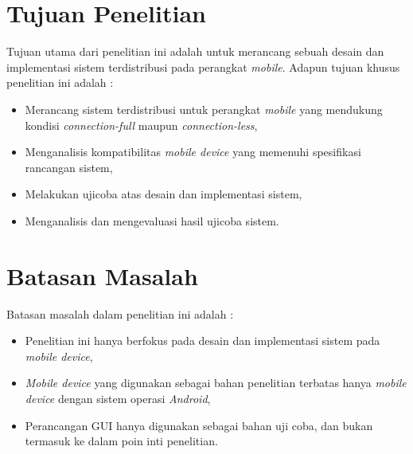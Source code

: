 \section{Tujuan Penelitian}
Tujuan utama dari penelitian ini adalah untuk merancang sebuah desain dan implementasi sistem terdistribusi pada perangkat \textit{mobile}. Adapun tujuan khusus penelitian ini adalah :
\begin{itemize}
\item Merancang sistem terdistribusi untuk perangkat \textit{mobile} yang mendukung kondisi \textit{connection-full} maupun \textit{connection-less},
\item Menganalisis kompatibilitas \textit{mobile device} yang memenuhi spesifikasi rancangan sistem,
\item Melakukan ujicoba atas desain dan implementasi sistem,
\item Menganalisis dan mengevaluasi hasil ujicoba sistem.
\end{itemize}

\section{Batasan Masalah}
Batasan masalah dalam penelitian ini adalah :
\begin{itemize}
\item Penelitian ini hanya berfokus pada desain dan implementasi sistem pada \textit{mobile device},
\item \textit{Mobile device} yang digunakan sebagai bahan penelitian terbatas hanya \textit{mobile device} dengan sistem operasi \textit{Android},
\item Perancangan GUI hanya digunakan sebagai bahan uji coba, dan bukan termasuk ke dalam poin inti penelitian.
\end{itemize}


